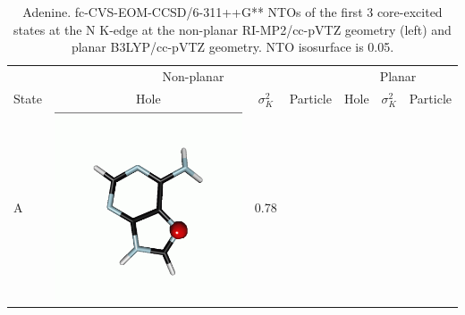 \documentclass[journal=jctcce,manuscript=article]{achemso}
\begin{document}
\begin{table}[H]
\centering
\caption{Adenine. fc-CVS-EOM-CCSD/6-311++G** NTOs of the first 3 core-excited states at the N K-edge at the non-planar RI-MP2/cc-pVTZ geometry (left) and planar B3LYP/cc-pVTZ geometry. NTO isosurface is 0.05.\label{adenine-ntos-Nedge}}
\vspace{3em}
\small
\begin{tabular}{ l | c c c | c c c }
    \hline
            & \multicolumn{3}{c}{Non-planar} & \multicolumn{3}{|c}{Planar} \\
    State &  Hole &$\sigma_K^2$& Particle & Hole &$\sigma_K^2$& Particle \\
    \hline
    A &  
    \begin{minipage}{0.2\textwidth}
        \centering
        \includegraphics[scale=0.10]{NTO/Adenine_N/1h_C1.png}
    \end{minipage}
    & 0.78
    &  \begin{minipage}{0.2\textwidth}
        \centering

\end{minipage}
\end{tabular}
\end{table}
\end{document}
